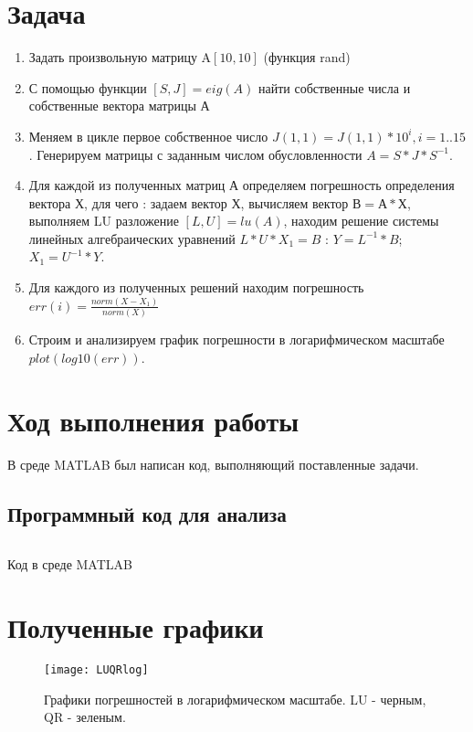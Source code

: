 \section{Задача}

\begin{enumerate}
	\item Задать произвольную матрицу A\([10,10]\) (функция rand)
	\item С помощью функции \([S,J]=eig(A)\) найти собственные числа и собственные вектора матрицы А
	\item Меняем в цикле первое собственное число \(J(1,1)=J(1,1)*10^i, i = 1..15\). Генерируем матрицы с заданным числом обусловленности \(A=S*J*S^{-1}\).
	\item Для каждой из полученных матриц А определяем погрешность определения вектора Х, для чего : задаем вектор Х, вычисляем вектор \(В=А*Х\), выполняем LU разложение \([L,U]=lu(A)\), находим решение системы линейных алгебраических уравнений \(L*U*X_1=B\) : \(Y=L^{-1}*B\); \(X_1=U^{-1}*Y\).
	\item Для каждого из полученных решений находим погрешность \(err(i)=\frac{norm(X-X_1)}{norm(X)}\)
	\item Строим и анализируем график погрешности в логарифмическом масштабе \(plot(log10(err))\).
\end{enumerate}

\newpage

\section{Ход выполнения работы}

В среде MATLAB был написан код, выполняющий поставленные задачи.

\subsection{Программный код для анализа}
\begin{code}
	\inputminted[breaklines=true, xleftmargin=1em, linenos, frame=single, framesep=10pt, fontsize=\footnotesize, firstline=1, lastline=33]{matlab}{listings/luqr.m}
	\caption{Код в среде MATLAB}
\end{code}

\section{Полученные графики}

\begin{figure}[H]
	\begin{center}
		\texttt{[image: LUQRlog]}
		\caption{Графики погрешностей в логарифмическом масштабе. LU - черным, QR - зеленым.}
		\label{pic:luqr} %
	\end{center}
\end{figure}


